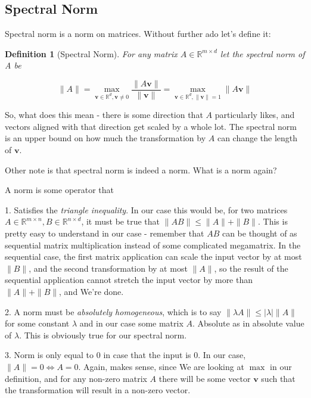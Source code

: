 \documentclass{article}
\newtheorem{definition}[theorem]{Definition}
\begin{document}
	\subsection{Spectral Norm}
	
		Spectral norm is a norm on matrices. Without further ado let's define it:
		
		\begin{definition}[Spectral Norm]
			For any matrix $A\in\mathbb{R}^{m\times d}$ let the spectral norm of A be
			
			\[ \|A\| = \max_{\mathbf{v}\in\mathbb{R}^d, \mathbf{v}\neq 0} \frac{\|A\mathbf{v}\|}{\|\mathbf{v}\|} = \max_{\mathbf{v}\in\mathbb{R}^d, \| \mathbf{v}\|=1} \|A\mathbf{v}\|  \]
		\end{definition}
		
		So, what does this mean - there is some direction that $A$ particularly likes, and vectors aligned with that direction get scaled by a whole lot. The spectral norm is an upper bound on how much the transformation by $A$ can change the length of $\mathbf{v}$. 
		
		Other note is that spectral norm is indeed a norm. What is a norm again?
		
		A norm is some operator that
		
		1. Satisfies the \textit{triangle inequality}. In our case this would be, for two matrices $A\in\mathbb{R}^{m\times n}, B\in\mathbb{R}^{n\times d}$, it must be true that $\|AB\| \le \|A\| + \|B\|$. This is pretty easy to understand in our case - remember that $AB$ can be thought of as sequential matrix multiplication instead of some complicated megamatrix. In the sequential case, the first matrix application can scale the input vector by at most $\|B\|$, and the second transformation by at most $\|A\|$, so the result of the sequential application cannot stretch the input vector by more than $\|A\|+\|B\|$, and We're done.
		
		2. A norm must be \textit{absolutely homogeneous}, which is to say $\|\lambda A\| \le |\lambda|\|A\|$ for some constant $\lambda$ and in our case some matrix $A$. Absolute as in absolute value of $\lambda$. This is obviously true for our spectral norm.
		
		3. Norm is only equal to 0 in case that the input is 0. In our case, $\|A\| = 0\iff A=0$. Again, makes sense, since We are looking at $\max$ in our definition, and for any non-zero matrix $A$ there will be some vector $\mathbf{v}$ such that the transformation will result in a non-zero vector.
		
\end{document}
